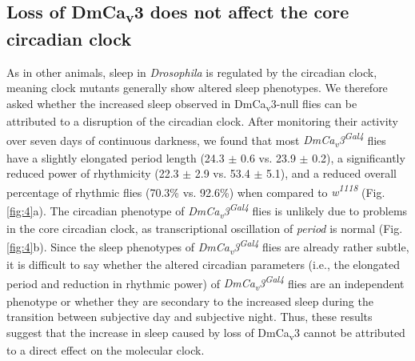 \subsection*{Loss of DmCa\textsubscript{v}3 does not affect the core circadian clock}

As in other animals, sleep in \emph{Drosophila} is regulated by the circadian clock, meaning clock mutants generally show altered sleep phenotypes\cite{hendricks:2003aa, parisky:2008aa}.
We therefore asked whether the increased sleep observed in DmCa\textsubscript{v}3-null flies can be attributed to a disruption of the circadian clock.
After monitoring their activity over seven days of continuous darkness, we found that most \emph{DmCa\textsubscript{v}3\textsuperscript{Gal4}} flies have a slightly elongated period length (24.3 $\pm$ 0.6 vs. 23.9 $\pm$ 0.2), a significantly reduced power of rhythmicity (22.3 $\pm$ 2.9 vs. 53.4 $\pm$ 5.1), and a reduced overall percentage of rhythmic flies (70.3\% vs. 92.6\%) when compared to \emph{w\textsuperscript{1118}} (Fig. \ref{fig:4}a).
The circadian phenotype of \emph{DmCa\textsubscript{v}3\textsuperscript{Gal4}} flies is unlikely due to problems in the core circadian clock, as transcriptional oscillation of \emph{period} is normal (Fig. \ref{fig:4}b).
Since the sleep phenotypes of \emph{DmCa\textsubscript{v}3\textsuperscript{Gal4}} flies are already rather subtle, it is difficult to say whether the altered circadian parameters (i.e., the elongated period and reduction in rhythmic power) of \emph{DmCa\textsubscript{v}3\textsuperscript{Gal4}} flies are an independent phenotype or whether they are secondary to the increased sleep during the transition between subjective day and subjective night.
Thus, these results suggest that the increase in sleep caused by loss of DmCa\textsubscript{v}3 cannot be attributed to a direct effect on the molecular clock.
